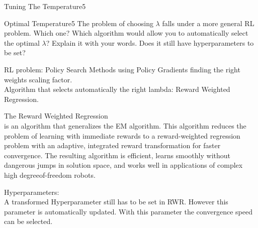 \begin{questions}
\begin{question}{Tuning The Temperature}{5}
\end{question}


\begin{question}[bonus]{Optimal Temperature}{5}
The problem of choosing $\lambda$ falls under a more general RL problem. Which one?
Which algorithm would allow you to automatically select the optimal $\lambda$? Explain it with your words.
Does it still have hyperparameters to be set?

\begin{answer}
RL problem: Policy Search Methods using Policy Gradients finding the right weights scaling factor. 
\\
 Algorithm that selects automatically the right lambda: Reward Weighted Regression.

The Reward Weighted Regression\\ is an algorithm that generalizes the EM algorithm. This algorithm reduces the problem of learning with immediate rewards to a reward-weighted regression problem with an adaptive, integrated reward transformation for faster convergence.  The resulting algorithm is efficient, learns smoothly without
dangerous jumps in solution space, and works well in applications of complex high degreeof-freedom robots.

Hyperparameters:\\
A transformed Hyperparameter still has to be set in RWR. However this parameter is automatically updated. With this parameter the convergence speed can be selected.
\end{answer}


\end{question}


\end{questions}

